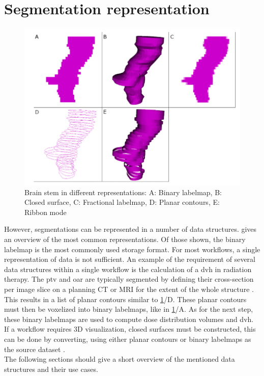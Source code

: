 \section{Segmentation representation}\label{s:b-seg-rep}
\begin{figure}[h]
	\centerline{
		\includegraphics[scale=0.5]{images/segRep.png}}
	\caption{Brain stem in different representations: A: Binary labelmap, B: Closed surface, C: Fractional labelmap, D: Planar contours, E: Ribbon mode \cite{pinterPolymorphSegmentationRepresentation2019}}\label{fig:segRep}
\end{figure}
\noindent
However, segmentations can be represented in a number of data structures.
 gives an overview of the most common representations.
Of those shown, the binary labelmap is the most commonly used storage format.
For most workflows, a single representation of data is not sufficient.
An example of the requirement of several data structures within a single workflow is the calculation of a \acrfull{dvh} in radiation therapy.
The \acrfull{ptv} and \acrfull{oar} are typically segmented by defining their cross-section per
image slice on a planning CT or MRI for the extent of the whole structure \cite{burnetDefiningTumourTarget2004}.
This results in a list of planar contours similar to \cref{fig:segRep}/D.
These planar contours must then be voxelized into binary labelmaps, like in \cref{fig:segRep}/A.
As for the next step, these binary labelmaps are used to compute dose distribution volumes and \acrlong{dvh}.
If a workflow requires 3D visualization, closed surfaces must be constructed, this can be done by converting,
using either planar contours or binary labelmaps as the source dataset \cite{pinterPolymorphSegmentationRepresentation2019}.\\
The following sections should give a short overview of the mentioned data structures and their use cases.

